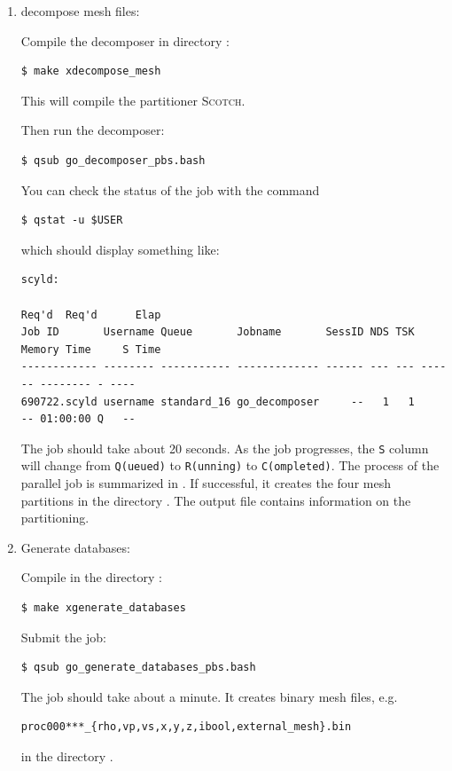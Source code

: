 \documentclass[10pt,fleqn,letterpaper]{article}
\begin{document}
\begin{enumerate}
\item decompose mesh files:

Compile the decomposer in directory :
\begin{lstlisting}
$ make xdecompose_mesh
\end{lstlisting}
%
This will compile the partitioner \textsc{Scotch}.

Then run the decomposer:
\begin{lstlisting}
$ qsub go_decomposer_pbs.bash
\end{lstlisting}
%
You can check the status of the job with the command
%
\begin{lstlisting}
$ qstat -u $USER
\end{lstlisting}
%
which should display something like:
%
\begin{lstlisting}
scyld: 
                                                               Req'd  Req'd      Elap
Job ID       Username Queue       Jobname       SessID NDS TSK Memory Time     S Time
------------ -------- ----------- ------------- ------ --- --- ------ -------- - ----
690722.scyld username standard_16 go_decomposer     --   1   1     -- 01:00:00 Q   -- 
\end{lstlisting}

The job should take about 20 seconds. As the job progresses, the \texttt{S} column will change from \texttt{Q(ueued)} to \texttt{R(unning)} to \texttt{C(ompleted)}. The process of the parallel job is summarized in . If successful, it creates the four mesh partitions  in the directory . The output file  contains information on the partitioning.

\item Generate databases:

Compile  in the directory :
\begin{lstlisting}
$ make xgenerate_databases
\end{lstlisting}
Submit the job:
\begin{lstlisting}
$ qsub go_generate_databases_pbs.bash
\end{lstlisting}

The job should take about a minute.
It creates binary mesh files, e.g. 
\begin{lstlisting}
proc000***_{rho,vp,vs,x,y,z,ibool,external_mesh}.bin
\end{lstlisting}
in the directory .


\end{enumerate}
\end{document}
